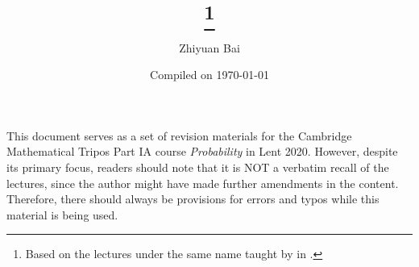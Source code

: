 \documentclass[a4paper]{article}
\title{\triposcourse{}
\thanks{Based on the lectures under the same name taught by \triposlecturer{} in \triposterm{}.}}
\author{Zhiyuan Bai}
\date{Compiled on \today}
\newcommand{\triposcourse}{Probability}
\newcommand{\triposterm}{Lent 2020}
\newcommand{\tripospart}{IA}
\theoremstyle{plain}
\theoremstyle{definition}
\theoremstyle{remark}
\begin{document}
    \maketitle
    This document serves as a set of revision materials for the Cambridge Mathematical Tripos Part \tripospart{} course \textit{\triposcourse{}} in \triposterm{}.
    However, despite its primary focus, readers should note that it is NOT a verbatim recall of the lectures, since the author might have made further amendments in the content.
    Therefore, there should always be provisions for errors and typos while this material is being used.
    \tableofcontents
    
    
    
    
    
    
    
    
    
    
    
    
    
    
    
    
    
\end{document}

